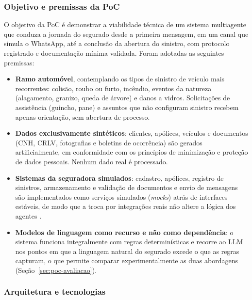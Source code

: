\subsubsection{Objetivo e premissas da PoC}

O objetivo da PoC é demonstrar a viabilidade técnica de um sistema multiagente que conduza a
jornada do segurado desde a primeira mensagem, em um canal que simula o WhatsApp, até a
conclusão da abertura do sinistro, com protocolo registrado e documentação mínima validada.
Foram adotadas as seguintes premissas:

\begin{itemize}
  \item \textbf{Ramo automóvel}, contemplando os tipos de sinistro de veículo mais recorrentes:
        colisão, roubo ou furto, incêndio, eventos da natureza (alagamento, granizo, queda de
        árvore) e danos a vidros. Solicitações de assistência (guincho, pane) e assuntos que
        não configuram sinistro recebem apenas orientação, sem abertura de processo.
  \item \textbf{Dados exclusivamente sintéticos}: clientes, apólices, veículos e documentos
        (CNH, CRLV, fotografias e boletins de ocorrência) são gerados artificialmente, em
        conformidade com os princípios de minimização e proteção de dados pessoais. Nenhum dado
        real é processado.
  \item \textbf{Sistemas da seguradora simulados}: cadastro, apólices, registro de sinistros,
        armazenamento e validação de documentos e envio de mensagens são implementados como
        serviços simulados (\textit{mocks}) atrás de interfaces estáveis, de modo que a troca
        por integrações reais não altere a lógica dos agentes \cite{ofoeda2019}.
  \item \textbf{Modelos de linguagem como recurso e não como dependência}: o sistema funciona
        integralmente com regras determinísticas e recorre ao LLM nos pontos em que a
        linguagem natural do segurado excede o que as regras capturam, o que permite comparar
        experimentalmente as duas abordagens (Seção~\ref{sec:poc-avaliacao}).
\end{itemize}

\subsubsection{Arquitetura e tecnologias}

